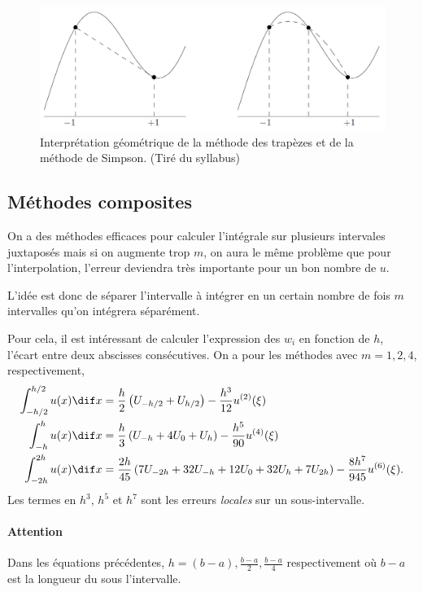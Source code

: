 \begin{figure}[ht]
	\centering
	\includegraphics[scale=0.6]{trapezes_simpson.png}
	\caption{Interprétation géométrique de la méthode des trapèzes et de
	la méthode de Simpson. (Tiré du syllabus)}
	\label{fig:trapeze-simpson}
\end{figure}

\subsection{Méthodes composites}
On a des méthodes efficaces pour calculer l'intégrale sur plusieurs
intervales juxtaposés mais si on augmente trop $m$, on aura le même problème
que pour l'interpolation, l'erreur deviendra très importante pour un bon
nombre de $u$.

L'idée est donc de séparer l'intervalle à intégrer en un certain nombre
de fois $m$ intervalles qu'on intégrera séparément.

Pour cela, il est intéressant de calculer l'expression des $w_i$
en fonction de $h$, l'écart entre deux abscisses consécutives.
On a pour les méthodes avec $m = 1, 2, 4$, respectivement,
\begin{align*}
  \int_{-h/2}^{h/2}u(x)\dif x & =
  \frac{h}{2} \left(U_{-h/2} + U_{h/2}\right)
  -\frac{h^3}{12}u^{(2)}(\xi)\\
  \int_{-h}^{h}u(x)\dif x & =
  \frac{h}{3} \left(U_{-h} + 4 U_0 + U_{h}\right)
  -\frac{h^5}{90}u^{(4)}(\xi)\\
  \int_{-2h}^{2h}u(x)\dif x & =
  \frac{2h}{45}
  \left(7U_{-2h} + 32U_{-h} +12U_0 + 32U_{h} + 7U_{2h}\right)
  -\frac{8h^7}{945}u^{(6)}(\xi).
\end{align*}
Les termes en $h^3$, $h^5$ et $h^7$ sont les erreurs \emph{locales}
sur un sous-intervalle.

\paragraph{Attention}
Dans les équations précédentes, $h = (b-a), \frac{b-a}{2}, \frac{b-a}{4}$
respectivement où $b-a$ est la longueur du sous l'intervalle.


